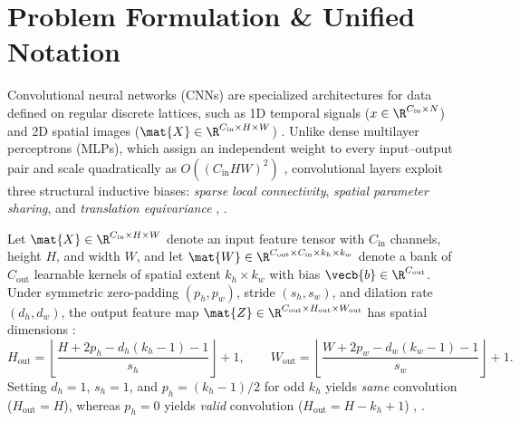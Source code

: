 \documentclass[../../../../master.tex]{subfiles}
\begin{document}

\section{Problem Formulation \& Unified Notation}
\label{sec:cnn:formulation}

Convolutional neural networks (CNNs) are specialized architectures for data defined on regular discrete lattices, such as 1D temporal signals ($x \in \R^{C_{\mathrm{in}} \times N}$) and 2D spatial images ($\mat{X} \in \R^{C_{\mathrm{in}} \times H \times W}$) . Unlike dense multilayer perceptrons (MLPs), which assign an independent weight to every input--output pair and scale quadratically as $O((C_{\mathrm{in}} H W)^2)$ , convolutional layers exploit three structural inductive biases: \emph{sparse local connectivity}, \emph{spatial parameter sharing}, and \emph{translation equivariance} , .

Let $\mat{X} \in \R^{C_{\mathrm{in}} \times H \times W}$ denote an input feature tensor with $C_{\mathrm{in}}$ channels, height $H$, and width $W$, and let $\mat{W} \in \R^{C_{\mathrm{out}} \times C_{\mathrm{in}} \times k_h \times k_w}$ denote a bank of $C_{\mathrm{out}}$ learnable kernels of spatial extent $k_h \times k_w$ with bias $\vecb{b} \in \R^{C_{\mathrm{out}}}$. Under symmetric zero-padding $(p_h, p_w)$, stride $(s_h, s_w)$, and dilation rate $(d_h, d_w)$, the output feature map $\mat{Z} \in \R^{C_{\mathrm{out}} \times H_{\mathrm{out}} \times W_{\mathrm{out}}}$ has spatial dimensions :
\begin{equation}
\label{eq:cnn:output_shape}
H_{\mathrm{out}} = \left\lfloor \frac{H + 2p_h - d_h(k_h - 1) - 1}{s_h} \right\rfloor + 1, \qquad
W_{\mathrm{out}} = \left\lfloor \frac{W + 2p_w - d_w(k_w - 1) - 1}{s_w} \right\rfloor + 1.
\end{equation}
Setting $d_h = 1$, $s_h = 1$, and $p_h = (k_h - 1)/2$ for odd $k_h$ yields \emph{same} convolution ($H_{\mathrm{out}} = H$), whereas $p_h = 0$ yields \emph{valid} convolution ($H_{\mathrm{out}} = H - k_h + 1$) , .
\end{document}
